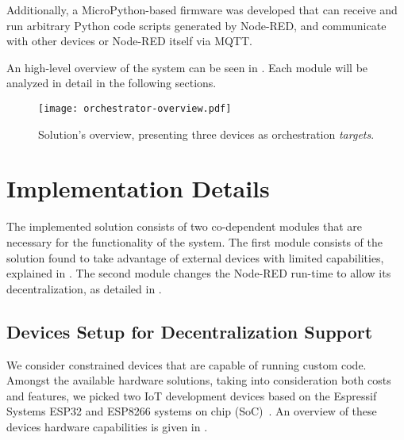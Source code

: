 Additionally, a MicroPython-based firmware was developed that can receive and run arbitrary Python code scripts generated by Node-RED, and communicate with other devices or Node-RED itself via MQTT. 

An high-level overview of the system can be seen in . Each module will be analyzed in detail in the following sections.

\begin{figure}[h]
    \centering
    \texttt{[image: orchestrator-overview.pdf]}
    \caption{Solution's overview, presenting three devices as orchestration \textit{targets}.}
    \label{fig:solution_overview}
\end{figure}

\section{Implementation Details}\label{sec:implementation_details}

The implemented solution consists of two co-dependent modules that are necessary for the functionality of the system. The first module consists of the solution found to take advantage of external devices with limited capabilities, explained in . The second module changes the Node-RED run-time to allow its decentralization, as detailed in .

\subsection{Devices Setup for Decentralization Support}\label{sec:devices_decentralization}

We consider constrained devices that are capable of running custom code. Amongst the available hardware solutions, taking into consideration both costs and features, we picked two IoT development devices based on the Espressif Systems ESP32 and ESP8266 systems on chip (SoC)~\cite{esp32,esp8266}. An overview of these devices hardware capabilities is given in .

